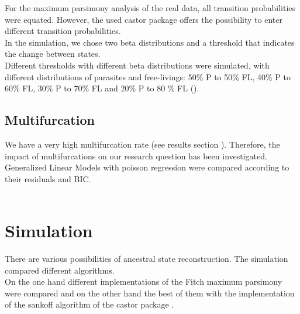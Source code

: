       For the maximum parsimony analysis of the real data, all transition probabilities were equated.
        However, the used castor package \cite{Louca2017} offers the possibility to enter different 
        transition probabilities. \\

      In the simulation, we chose two beta distributions and a threshold that indicates the change 
        between states. \\
      Different thresholds with different beta distributions were simulated, with different distributions 
        of parasites and free-livings: 50\% P to 50\% FL, 40\% P to 60\% FL, 30\% P to 70\% FL and 
        20\% P to 80 \% FL ().

    \subsection{Multifurcation}
      We have a very high multifurcation rate (see results section \pageref{sec:ResultsMultifurcation}).
      Therefore, the impact of multifurcations on our research question has been investigated. \\
      Generalized Linear Models with poisson regression were compared according to their residuals and 
      BIC. \\
       \\

  \section{Simulation}\label{sec:simulation}
    There are various possibilities of ancestral state reconstruction. The simulation compared 
      different algorithms. \\
    On the one hand different implementations of the Fitch maximum parsimony were compared and on the 
      other hand the best of them with the implementation of the sankoff algorithm of the castor 
      package \cite{Louca2017}. \\

